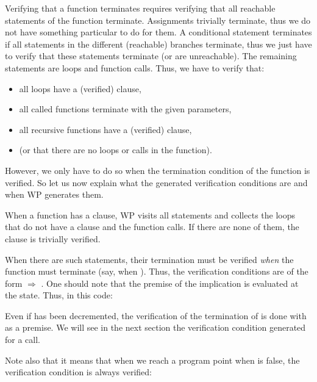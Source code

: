 

Verifying that a function terminates requires verifying that all reachable
statements of the function terminate. Assignments trivially terminate, thus
we do not have something particular to do for them. A conditional statement
terminates if all statements in the different (reachable) branches terminate,
thus we just have to verify that these statements terminate (or are unreachable).
The remaining statements are loops and function calls. Thus, we have to verify
that:
\begin{itemize}
  \item all loops have a (verified)  clause,
  \item all called functions terminate with the given parameters,
  \item all recursive functions have a (verified)  clause,
  \item (or that there are no loops or calls in the function).
\end{itemize}


However, we only have to do so when the termination condition of the function
is verified. So let us now explain what the generated verification
conditions are and when WP generates them.


When a function has a  clause, WP visits all statements
and collects the loops that do not have a  clause and
the function calls. If there are none of them, the 
clause is trivially verified.




When there are such statements, their termination must be verified {\em when}
the function must terminate (say, when ). Thus, the verification
conditions are of the form
 $\Rightarrow$ .
One should note that the premise of the implication is evaluated at the
 state. Thus, in this code:




Even if  has been decremented, the verification of the
termination of  is done with
 as a premise. We will see in the
next section the verification condition generated for a call.


Note also that it means that when we reach a program point when 
is false, the verification condition is always verified:


